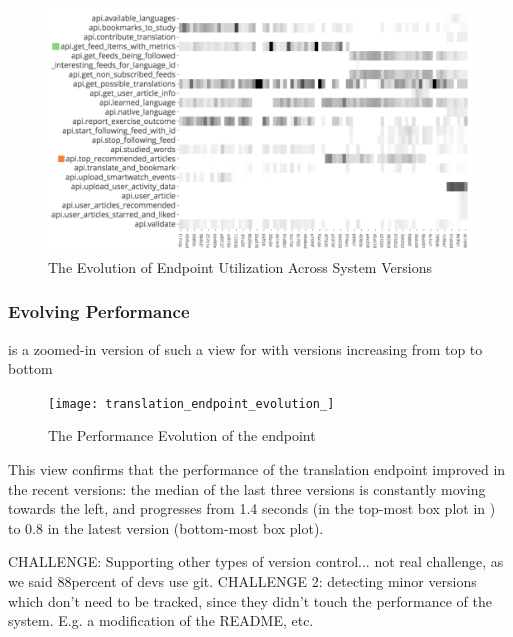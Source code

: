     \begin{figure}[h!]
      \centering
      \includegraphics[width=\linewidth]{utilization-evolution}
      \caption{The Evolution of Endpoint Utilization Across System Versions}
      \label{fig:mv-util}
    \end{figure}


    \subsubsection*{Evolving Performance}

     is a zoomed-in version of such a view for \epTranslations with versions increasing from top to bottom

    \begin{figure}[h!]
      \centering
      \texttt{[image: translation\_endpoint\_evolution\_]}
      \caption{The Performance Evolution of the \epTranslations endpoint}
      \label{fig:tee}
    \end{figure}


  This view confirms that the performance of the translation endpoint improved in the recent versions: the median of the last three versions is constantly moving towards the left, and progresses from 1.4 seconds (in the top-most box plot in ) to 0.8 in the latest version (bottom-most box plot).



  CHALLENGE: Supporting other types of version control... not real challenge, as we said 88percent of devs use git. 
  CHALLENGE 2: detecting minor versions which don't need to be tracked, since they didn't touch the performance of the system. E.g. a modification of the README, etc. 
  


